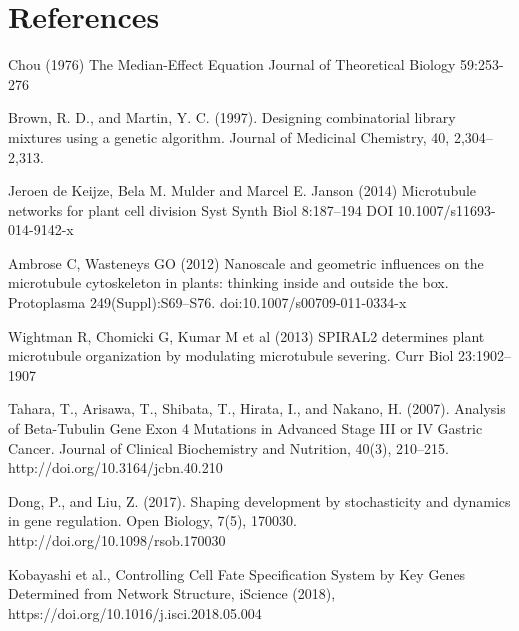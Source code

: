 \section{References}

Chou (1976)
\newblock The Median-Effect Equation
\newblock Journal of Theoretical Biology 59:253-276 

Brown, R. D., and Martin, Y. C. (1997). 
\newblock Designing combinatorial library mixtures using a genetic algorithm. 
\newblock Journal of Medicinal Chemistry, 40, 2,304–2,313.

Jeroen de Keijze, Bela M. Mulder and Marcel E. Janson (2014)
\newblock Microtubule networks for plant cell division
\newblock Syst Synth Biol 8:187–194 DOI 10.1007/s11693-014-9142-x

 Ambrose   C,   Wasteneys   GO   (2012)   
\newblock Nanoscale  and  geometric influences  on  the  microtubule  cytoskeleton  in  plants:  thinking inside  and  outside  the  box.  
\newblock Protoplasma  249(Suppl):S69–S76. doi:10.1007/s00709-011-0334-x

 Wightman   R,   Chomicki   G,   Kumar   M   et   al   (2013)   
\newblock SPIRAL2 determines plant microtubule organization by modulating microtubule severing. 
\newblock Curr Biol 23:1902–1907

Tahara, T., Arisawa, T., Shibata, T., Hirata, I., and Nakano, H. (2007). 
\newblock Analysis of Beta-Tubulin Gene Exon 4 Mutations in Advanced Stage III or IV Gastric Cancer. 
\newblock Journal of Clinical Biochemistry and Nutrition, 40(3), 210–215. http://doi.org/10.3164/jcbn.40.210

Dong, P., and Liu, Z. (2017). 
\newblock Shaping development by stochasticity and dynamics in gene regulation. 
\newblock Open Biology, 7(5), 170030. http://doi.org/10.1098/rsob.170030

Kobayashi et al., 
\newblock Controlling Cell Fate Specification System by Key Genes Determined from Network Structure,
\newblock iScience (2018), https://doi.org/10.1016/j.isci.2018.05.004

